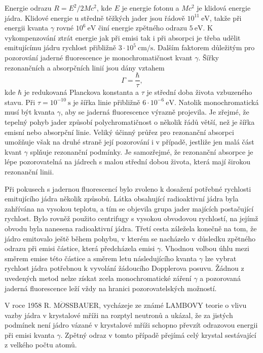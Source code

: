 \documentclass[../../main.tex]{subfiles}
\begin{document}
Energie odrazu $R = E^2 /2 M c^2$, kde $E$ je energie fotonu a $Mc^2$ je klidová energie jádra. Klidové energie u středně těžkých jader jsou řádově $10^{11} ~\mathrm{eV}$, takže při energii kvanta $\gamma$ rovné $10^{6} ~\mathrm{eV}$ činí energie zpětného odrazu $5 ~\mathrm{eV}$. K vykompenzování ztrát energie jak při emisi tak i při absorpci je třeba udělit emitujícímu jádru rychlost přibližně $3 \cdotp 10^5 ~\mathrm{cm/s}$. Dalším faktorem důležitým pro pozorování jaderné fluorescence je monochromatičnost
kvant $\gamma$. Šířky rezonančních a absorpčních linií jsou dány vztahem
\begin{equation}
\Gamma = \dfrac{\hbar}{\tau},
\end{equation}
kde $\hbar$ je redukovaná Planckova konstanta a $\tau$ je střední doba života vzbuzeného stavu. Při $\tau = 10^{-10} ~\mathrm{s}$ je šířka linie přibližně $6 \cdotp 10^{-6} ~\mathrm{eV}$. Natolik monochromatická
musí být kvanta $\gamma$, aby se jaderná fluorescence výrazně projevila. Je zřejmé, že tepelný pohyb jader způsobí polychromatičnost o několik řádů větší, než je šířka emisní nebo absorpční linie. Veliký účinný průřez pro rezonanční absorpci umožňuje však na druhé straně její pozorování i v případě, jestliže jen
malá část kvant $\gamma$ splňuje rezonanční podmínky. Je samozřejmé, že rezonanční absorpce je lépe pozorovatelná na jádrech s malou střední dobou života, která mají širokou rezonanční linii. 

Při pokusech s jadernou fluorescencí bylo zvoleno k dosažení potřebné rychlosti emitujícího jádra několik způsobů. Látka obsahující radioaktivní jádra byla zahřívána na vysokou teplotu, a tím se objevila grupa jader majících postačující rychlost. Bylo rovněž použito centrifugy s vysokou obvodovou rychlostí, na jejímž obvodu byla nanesena radioaktivní jádra. Třetí cesta záležela konečně na tom, že jádro emitovalo ještě během pohybu, v kterém se nacházelo v důsledku zpětného odrazu při emisi částice, která předcházela
emisi $\gamma$. Vhodnou volbou úhlu mezi směrem emise této částice a směrem letu následujícího kvanta $\gamma$ lze vybrat rychlost jádra potřebnou k vyvolání žádoucího Dopplerova posuvu. Žádnou z uvedených metod nelze získat zcela monochromatické záření $\gamma$ a pozorovaná jaderná fluorescence leží vždy na hranici pozorovatelských možností. 

V roce 1958 R. M$\ddot{O}$SSBAUER, vycházeje ze známé LAMBOVY teorie o vlivu vazby jádra v krystalové mříži na rozptyl neutronů a ukázal, že za jistých podmínek není jádro vázané v krystalové mříži schopno převzít odrazovou energii při emisi kvanta $\gamma$. Zpětný odraz v tomto případě přejímá celý krystal sestávající z velkého počtu atomů. 
\end{document}
